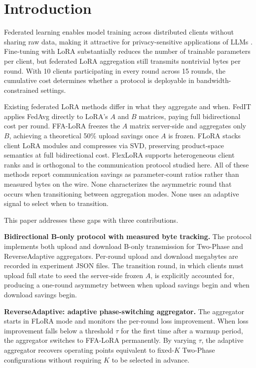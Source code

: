 \section{Introduction}
\label{sec:intro}

Federated learning enables model training across distributed clients without sharing raw data, making it attractive for privacy-sensitive applications of LLMs \citep{kairouz2021advances}. Fine-tuning with LoRA \citep{hu2022lora} substantially reduces the number of trainable parameters per client, but federated LoRA aggregation still transmits nontrivial bytes per round. With 10 clients participating in every round across 15 rounds, the cumulative cost determines whether a protocol is deployable in bandwidth-constrained settings.

Existing federated LoRA methods differ in what they aggregate and when. FedIT \citep{zhang2024federatedgpt} applies FedAvg \citep{mcmahan2017communication} directly to LoRA's $A$ and $B$ matrices, paying full bidirectional cost per round. FFA-LoRA \citep{sun2024ffalora} freezes the $A$ matrix server-side and aggregates only $B$, achieving a theoretical 50\% upload savings once $A$ is frozen. FLoRA \citep{wang2024flora} stacks client LoRA modules and compresses via SVD, preserving product-space semantics at full bidirectional cost. FlexLoRA \citep{bai2024flexlora} supports heterogeneous client ranks and is orthogonal to the communication protocol studied here. All of these methods report communication savings as parameter-count ratios rather than measured bytes on the wire. None characterizes the asymmetric round that occurs when transitioning between aggregation modes. None uses an adaptive signal to select when to transition.

This paper addresses these gaps with three contributions.

\textbf{Bidirectional B-only protocol with measured byte tracking.}
The protocol implements both upload and download B-only transmission for Two-Phase and ReverseAdaptive aggregators. Per-round upload and download megabytes are recorded in experiment JSON files. The transition round, in which clients must upload full state to seed the server-side frozen $A$, is explicitly accounted for, producing a one-round asymmetry between when upload savings begin and when download savings begin.

\textbf{ReverseAdaptive: adaptive phase-switching aggregator.}
The aggregator starts in FLoRA mode and monitors the per-round loss improvement. When loss improvement falls below a threshold $\tau$ for the first time after a warmup period, the aggregator switches to FFA-LoRA permanently. By varying $\tau$, the adaptive aggregator recovers operating points equivalent to fixed-$K$ Two-Phase configurations without requiring $K$ to be selected in advance.

